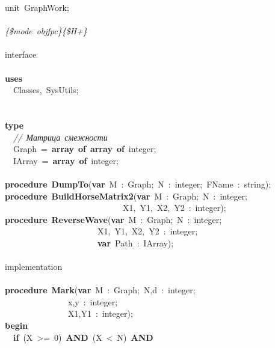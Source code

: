 \noindent
\mbox{}unit\ GraphWork; \\
\mbox{} \\
\mbox{}\textit{\{\$mode\ objfpc\}\{\$H+\}} \\
\mbox{} \\
\mbox{}interface \\
\mbox{} \\
\mbox{}\textbf{uses} \\
\mbox{}\ \ Classes,\ SysUtils; \\
\mbox{} \\
\mbox{} \\
\mbox{}\textbf{type} \\
\mbox{}\ \ \textit{//\ Матрица\ смежности} \\
\mbox{}\ \ Graph\ =\ \textbf{array}\ \textbf{of}\ \textbf{array}\ \textbf{of}\ integer; \\
\mbox{}\ \ IArray\ =\ \textbf{array}\ \textbf{of}\ integer; \\
\mbox{} \\
\mbox{}\textbf{procedure}\ \textbf{DumpTo}(\textbf{var}\ M\ :\ Graph;\ N\ :\ integer;\ FName\ :\ string); \\
\mbox{}\textbf{procedure}\ \textbf{BuildHorseMatrix2}(\textbf{var}\ M\ :\ Graph;\ N\ :\ integer; \\
\mbox{}\ \ \ \ \ \ \ \ \ \ \ \ \ \ \ \ \ \ \ \ \ \ \ \ \ \ \ \ X1,\ Y1,\ X2,\ Y2\ :\ integer); \\
\mbox{}\textbf{procedure}\ \textbf{ReverseWave}(\textbf{var}\ M\ :\ Graph;\ N\ :\ integer; \\
\mbox{}\ \ \ \ \ \ \ \ \ \ \ \ \ \ \ \ \ \ \ \ \ \ X1,\ Y1,\ X2,\ Y2\ :\ integer; \\
\mbox{}\ \ \ \ \ \ \ \ \ \ \ \ \ \ \ \ \ \ \ \ \ \ \textbf{var}\ Path\ :\ IArray); \\
\mbox{} \\
\mbox{}implementation \\
\mbox{} \\
\mbox{}\textbf{procedure}\ \textbf{Mark}(\textbf{var}\ M\ :\ Graph;\ N,d\ :\ integer; \\
\mbox{}\ \ \ \ \ \ \ \ \ \ \ \ \ \ \ x,y\ :\ integer; \\
\mbox{}\ \ \ \ \ \ \ \ \ \ \ \ \ \ \ X1,Y1\ :\ integer); \\
\mbox{}\textbf{begin} \\
\mbox{}\ \ \textbf{if}\ (X\ \textgreater{}=\ 0)\ \textbf{AND}\ (X\ \textless{}\ N)\ \textbf{AND} \\
